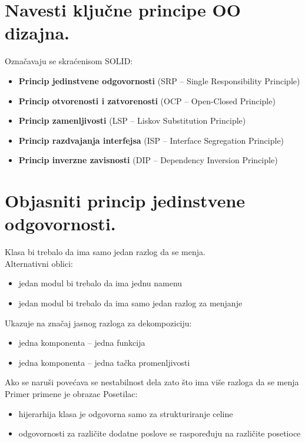 \documentclass[a4paper]{article}
\begin{document}
\section{Navesti ključne principe OO dizajna.}
  \item Označavaju se skraćenisom SOLID:
  \begin{itemize}
    \item \textbf{Princip jedinstvene odgovornosti} (SRP – Single Responsibility Principle)
    \item \textbf{Princip otvorenosti i zatvorenosti} (OCP – Open-Closed Principle)
    \item \textbf{Princip zamenljivosti} (LSP – Liskov Substitution Principle)
    \item \textbf{Princip razdvajanja interfejsa} (ISP – Interface Segregation Principle)
    \item \textbf{Princip inverzne zavisnosti} (DIP – Dependency Inversion Principle)
  \end{itemize}

\section{Objasniti princip jedinstvene odgovornosti.}
Klasa bi trebalo da ima samo jedan razlog da se menja.\\

Alternativni oblici:
\begin{itemize}
   \item jedan modul bi trebalo da ima jednu namenu
   \item jedan modul bi trebalo da ima samo jedan razlog za menjanje\\
\end{itemize}
   
Ukazuje na značaj jasnog razloga za dekompoziciju:
\begin{itemize}
   \item jedna komponenta – jedna funkcija
   \item jedna komponenta – jedna tačka promenljivosti\\
\end{itemize}

Ako se naruši povećava se nestabilnost dela zato što ima više razloga da se menja\\

Primer primene je obrazac Posetilac:
\begin{itemize}
   \item hijerarhija klasa je odgovorna samo za strukturiranje celine
   \item odgovornosti za različite dodatne poslove se raspoređuju na različite posetioce
\end{itemize}
\end{document}
